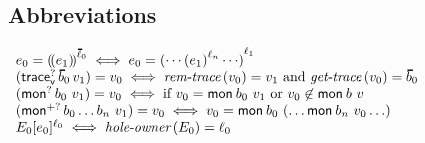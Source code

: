 \subsection{Abbreviations}
\begin{flushleft}
  \(\begin{array}{l}
  \sexpr_0 \eeq \obbars{\sexpr_1}{\sownerlist_0}
  \sabbreveq
  \sexpr_0 \eeq \obars{\cdots \obars{\sexpr_1}{\sowner_n} \cdots}{\sowner_1}
  \\
  (\ehopt{\sblist_0}{\svalue_1}) \eeq \svalue_0 \sabbreveq
      \mbox{$\fremtrace{\svalue_0} \eeq \svalue_1$ and $\fgettrace{\svalue_0} \eeq \sblist_0$}
  \\
  (\emopt{\sbnd_0}{\svalue_1}) \eeq \svalue_0 \sabbreveq
      \mbox{if $\svalue_0 \eeq \emon{\sbnd_0}{\svalue_1}$ or $\svalue_0 \not\in \emon{\sbnd}{\svalue}$}
  \\
  (\emoptplus{\sbnd_0 \ldots \sbnd_n}{\svalue_1}) \eeq \svalue_0 \sabbreveq
      \svalue_0 \eeq \emon{\sbnd_0}{(\ldots \emon{\sbnd_n}{\svalue_0} \ldots)}
  \\
  \ctx_0{\ctxbars{\sexpr_0}{\sowner_0}} \sabbreveq \fholeowner{\ctx_0} \feq \sowner_0
  \end{array}\)
\end{flushleft}

